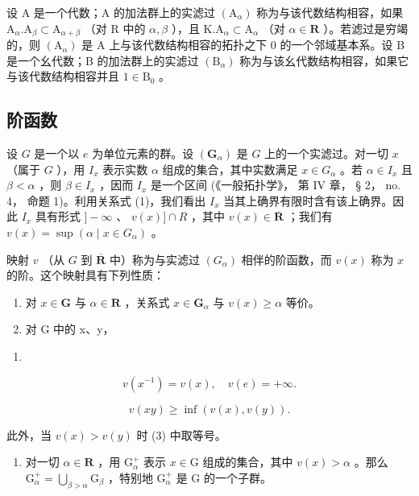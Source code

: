 设 A 是一个代数；A 的加法群上的实滤过 \((\mathrm{A}_{\alpha})\) 称为与该代数结构相容，如果 \(\mathrm{A}_{\alpha}.\mathrm{A}_{\beta}\subset \mathrm{A}_{\alpha +\beta}\) （对 R 中的 \(\alpha ,\beta\) ），且 \(\mathrm{K.A}_{\alpha}\subset \mathrm{A}_{\alpha}\) （对 \(\alpha \in \mathbf{R}\) ）。若滤过是穷竭的，则 \((\mathrm{A}_{\alpha})\) 是 A 上与该代数结构相容的拓扑之下 0 的一个邻域基本系。设 B 是一个幺代数；B 的加法群上的实滤过 \((\mathrm{B}_{\alpha})\) 称为与该幺代数结构相容，如果它与该代数结构相容并且 \(1\in \mathrm{B}_0\) 。

\subsection{阶函数}

设 \(G\) 是一个以 \(e\) 为单位元素的群。设 \((\mathbf{G}_{\alpha})\) 是 \(G\) 上的一个实滤过。对一切 \(x\) （属于 \(G\) ），用 \(I_x\) 表示实数 \(\alpha\) 组成的集合，其中实数满足 \(x \in G_{\alpha}\) 。若 \(\alpha \in I_x\) 且 \(\beta < \alpha\) ，则 \(\beta \in I_x\) ，因而 \(I_x\) 是一个区间 (《一般拓扑学》， 第 IV 章， § 2， no. 4， 命题 1)。利用关系式 (1)，我们看出 \(I_x\) 当其上确界有限时含有该上确界。因此 \(I_x\) 具有形式 \(] - \infty\) 、 \(v(x)] \cap R\) ，其中 \(v(x) \in \overline{\mathbf{R}}\) ；我们有 \(v(x) = \sup(\alpha \mid x \in G_{\alpha})\) 。

映射 \(v\) （从 \(G\) 到 \(\overline{\mathbf{R}}\) 中）称为与实滤过 \((G_{\alpha})\) 相伴的阶函数，而 \(v(x)\) 称为 \(x\) 的阶。这个映射具有下列性质：

\begin{enumerate}
\def\labelenumi{(\alph{enumi})}
\item
  对 \(x \in \mathbf{G}\) 与 \(\alpha \in \mathbf{R}\) ，关系式 \(x \in \mathbf{G}_{\alpha}\) 与 \(v(x) \geqslant \alpha\) 等价。
\item
  对 G 中的 x、y，
\end{enumerate}

\begin{enumerate}
\def\labelenumi{(\arabic{enumi})}
\setcounter{enumi}{1}
\tightlist
\item
\end{enumerate}

\[
v (x ^ {- 1}) = v (x), \quad v (e) = + \infty .\tag{2}
\]

\[
v (x y) \geqslant \inf (v (x), v (y)).\tag{3}
\]

此外，当 \(v(x) > v(y)\) 时 (3) 中取等号。

\begin{enumerate}
\def\labelenumi{(\alph{enumi})}
\setcounter{enumi}{2}
\tightlist
\item
  对一切 \(\alpha \in \mathbf{R}\) ，用 \(\mathrm{G}_{\alpha}^{+}\) 表示 \(x \in \mathrm{G}\) 组成的集合，其中 \(v(x) > \alpha\) 。那么 \(\mathrm{G}_{\alpha}^{+} = \bigcup_{\beta > \alpha} \mathrm{G}_{\beta}\) ，特别地 \(\mathrm{G}_{\alpha}^{+}\) 是 \(\mathrm{G}\) 的一个子群。
\end{enumerate}


